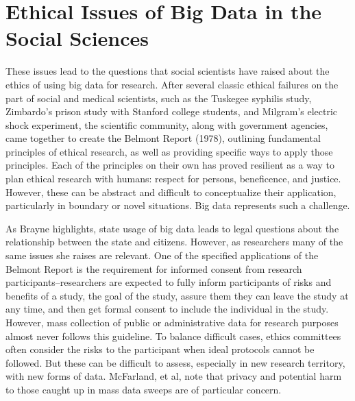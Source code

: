 \documentclass[sigconf]{acmart}
\begin{document}
\section{Ethical Issues of Big Data in the Social Sciences}
These issues lead to the questions that social scientists have raised about the ethics of using big data for research.  After several classic ethical failures on the part of social and medical scientists, such as the Tuskegee syphilis study, Zimbardo's prison study with Stanford college students, and Milgram's electric shock experiment, the scientific community, along with government agencies, came together to create the Belmont Report (1978), outlining fundamental principles of ethical research, as well as providing specific ways to apply those principles.\cite {fiske14}   Each of the principles on their own has proved resilient as a way to plan ethical research with humans: respect for persons, beneficence, and justice.  However, these can be abstract and difficult to conceptualize their application, particularly in boundary or novel situations.  Big data represents such a challenge.  

As Brayne highlights, state usage of big data leads to legal questions about the relationship between the state and citizens.  However, as researchers many of the same issues she raises are relevant.  One of the specified applications of the Belmont Report is the requirement for informed consent from research participants--researchers are expected to fully inform participants of risks and benefits of a study, the goal of the study, assure them they can leave the study at any time, and then get formal consent to include the individual in the study.  However, mass collection of public or administrative data for research purposes almost never follows this guideline.  To balance difficult cases, ethics committees often consider the risks to the participant when ideal protocols cannot be followed.  But these can be difficult to assess, especially in new research territory, with new forms of data.  McFarland, et al, note that privacy and potential harm to those caught up in mass data sweeps are of particular concern. \cite {mcfarland16}
\end{document}
